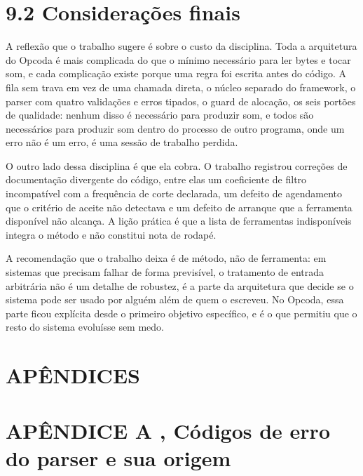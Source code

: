 \documentclass[12pt,a4paper]{article}
\begin{document}
\section*{9.2 Considerações finais}

A reflexão que o trabalho sugere é sobre o custo da disciplina. Toda a arquitetura do Opcoda é mais complicada do que o mínimo necessário para ler bytes e tocar som, e cada complicação existe porque uma regra foi escrita antes do código. A fila sem trava em vez de uma chamada direta, o núcleo separado do framework, o parser com quatro validações e erros tipados, o guard de alocação, os seis portões de qualidade: nenhum disso é necessário para produzir som, e todos são necessários para produzir som dentro do processo de outro programa, onde um erro não é um erro, é uma sessão de trabalho perdida.


O outro lado dessa disciplina é que ela cobra. O trabalho registrou correções de documentação divergente do código, entre elas um coeficiente de filtro incompatível com a frequência de corte declarada, um defeito de agendamento que o critério de aceite não detectava e um defeito de arranque que a ferramenta disponível não alcança. A lição prática é que a lista de ferramentas indisponíveis integra o método e não constitui nota de rodapé.


A recomendação que o trabalho deixa é de método, não de ferramenta: em sistemas que precisam falhar de forma previsível, o tratamento de entrada arbitrária não é um detalhe de robustez, é a parte da arquitetura que decide se o sistema pode ser usado por alguém além de quem o escreveu. No Opcoda, essa parte ficou explícita desde o primeiro objetivo específico, e é o que permitiu que o resto do sistema evoluísse sem medo.


\section*{APÊNDICES}

\section*{APÊNDICE A ,  Códigos de erro do parser e sua origem}
\end{document}
